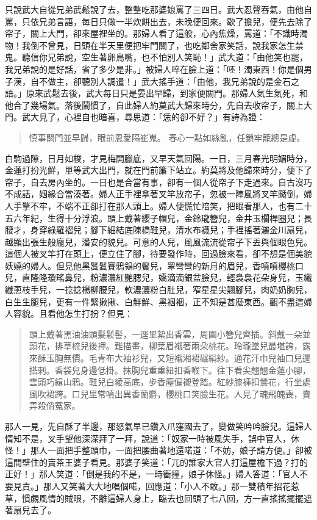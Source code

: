 只說武大自從兄弟武鬆說了去，整整吃那婆娘罵了三四日。武大忍聲吞氣，由他自罵，只依兄弟言語，每日只做一半炊餅出去，未晚便回來。歇了擔兒，便先去除了帘子，關上大門，卻來屋裡坐的。那婦人看了這般，心內焦燥，罵道：「不識時濁物！我倒不曾見，日頭在半天里便把牢門關了，也吃鄰舍家笑話，說我家怎生禁鬼。聽信你兄弟說，空生著卵鳥嘴，也不怕別人笑恥！」武大道：「由他笑也罷，我兄弟說的是好話，省了多少是非。」被婦人啐在臉上道：「呸！濁東西！你是個男子漢，自不做主，卻聽別人調遣！」武大搖手道：「由他，我兄弟說的是金石之語。」原來武鬆去後，武大每日只是晏出早歸，到家便關門。那婦人氣生氣死，和他合了幾場氣。落後鬧慣了，自此婦人約莫武大歸來時分，先自去收帘子，關上大門。武大見了，心裡自也暗喜，尋思道：「恁的卻不好？」有詩為證：
\begin{quote}
慎事關門並早歸，眼前恩愛隔崔嵬。
春心一點如絲亂，任鎖牢籠總是虛。
\end{quote}

白駒過隙，日月如梭，才見梅開臘底，又早天氣回陽。一日，三月春光明媚時分，金蓮打扮光鮮，單等武大出門，就在門前簾下站立。約莫將及他歸來時分，便下了帘子，自去房內坐的。一日也是合當有事，卻有一個人從帘子下走過來。自古沒巧不成話，姻緣合當湊著。婦人正手裡拿著叉竿放帘子，忽被一陣風將叉竿颳倒，婦人手擎不牢，不端不正卻打在那人頭上。婦人便慌忙陪笑，把眼看那人，也有二十五六年紀，生得十分浮浪。頭上戴著纓子帽兒，金鈴瓏簪兒，金井玉欄桿圈兒；長腰才，身穿綠羅褶兒；腳下細結底陳橋鞋兒，清水布襪兒；手裡搖著灑金川扇兒，越顯出張生般龐兒，潘安的貌兒。可意的人兒，風風流流從帘子下丟與個眼色兒。這個人被叉竿打在頭上，便立住了腳，待要發作時，回過臉來看，卻不想是個美貌妖嬈的婦人。但見他黑鬒鬒賽鴉鴒的鬢兒，翠彎彎的新月的眉兒，香噴噴櫻桃口兒，直隆隆瓊瑤鼻兒，粉濃濃紅艷腮兒，嬌滴滴銀盆臉兒，輕裊裊花朵身兒，玉纖纖蔥枝手兒，一捻捻楊柳腰兒，軟濃濃粉白肚兒，窄星星尖翹腳兒，肉奶奶胸兒，白生生腿兒，更有一件緊揪揪、白鮮鮮、黑裀裀，正不知是甚麼東西。觀不盡這婦人容貌。且看他怎生打扮？但見：
\begin{quote}
頭上戴著黑油油頭髮鬏髻，一逕里縶出香雲，周圍小簪兒齊插。斜戴一朵並頭花，排草梳兒後押。難描畫，柳葉眉襯著兩朵桃花。玲瓏墜兒最堪誇，露來酥玉胸無價。毛青布大袖衫兒，又短襯湘裙碾絹紗。通花汗巾兒袖口兒邊搭剌。香袋兒身邊低掛。抹胸兒重重紐扣香喉下。往下看尖翹翹金蓮小腳，雲頭巧緝山鴉。鞋兒白綾高底，步香塵偏襯登踏。紅紗膝褲扣鶯花，行坐處風吹裙跨。口兒里常噴出異香蘭麝，櫻桃口笑臉生花。人見了魂飛魄喪，賣弄殺俏冤家。
\end{quote}

那人一見，先自酥了半邊，那怒氣早已鑽入爪窪國去了，變做笑吟吟臉兒。這婦人情知不是，叉手望他深深拜了一拜，說道：「奴家一時被風失手，誤中官人，休怪！」那人一面把手整頭巾，一面把腰曲著地還喏道：「不妨，娘子請方便。」卻被這間壁住的賣茶王婆子看見。那婆子笑道：「兀的誰家大官人打這屋檐下過？打的正好！」那人笑道：「倒是我的不是，一時衝撞，娘子休怪。」婦人答道：「官人不要見責。」那人又笑著大大地唱個喏，回應道：「小人不敢。」那一雙積年招花惹草，慣覷風情的賊眼，不離這婦人身上，臨去也回頭了七八回，方一直搖搖擺擺遮著扇兒去了。

